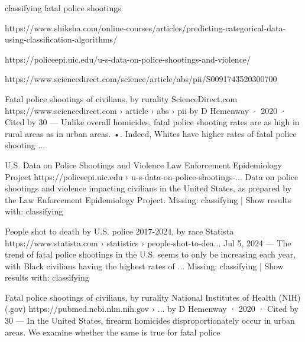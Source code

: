 classifying fatal police shootings

https://www.shiksha.com/online-courses/articles/predicting-categorical-data-using-classification-algorithms/

https://policeepi.uic.edu/u-s-data-on-police-shootings-and-violence/

https://www.sciencedirect.com/science/article/abs/pii/S0091743520300700


Fatal police shootings of civilians, by rurality
ScienceDirect.com
https://www.sciencedirect.com › article › abs › pii
by D Hemenway · 2020 · Cited by 30 — Unlike overall homicides, fatal police shooting rates are as high in rural areas as in urban areas. •. Indeed, Whites have higher rates of fatal police shooting ...

U.S. Data on Police Shootings and Violence
Law Enforcement Epidemiology Project
https://policeepi.uic.edu › u-s-data-on-police-shootings-...
Data on police shootings and violence impacting civilians in the United States, as prepared by the Law Enforcement Epidemiology Project.
Missing: classifying ‎| Show results with: classifying

People shot to death by U.S. police 2017-2024, by race
Statista
https://www.statista.com › statistics › people-shot-to-dea...
Jul 5, 2024 — The trend of fatal police shootings in the U.S. seems to only be increasing each year, with Black civilians having the highest rates of ...
Missing: classifying ‎| Show results with: classifying

Fatal police shootings of civilians, by rurality
National Institutes of Health (NIH) (.gov)
https://pubmed.ncbi.nlm.nih.gov › ...
by D Hemenway · 2020 · Cited by 30 — In the United States, firearm homicides disproportionately occur in urban areas. We examine whether the same is true for fatal police 
